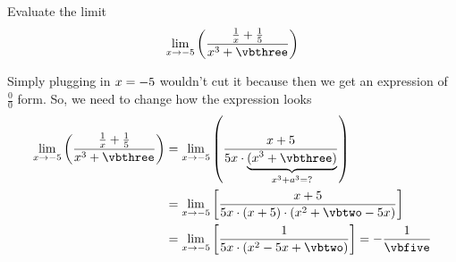 


\POWER{}\vbtwo
\POWER{}\vbthree
\SQUARE\vbtwo\vbfour
\MULTIPLY{}\vbfive

\question[2] Evaluate the limit \[\lim_{x\to -\vbone}\left(\dfrac{\frac{1}{x} + \frac{1}{\vbone}}{x^3+\vbthree} \right) \]

\watchout

\begin{solution}[\mcq]
  Simply plugging in $x=-5$ wouldn't cut it because then we get an expression of $\frac{0}{0}$ form. So, we need to change how the expression looks 
  \begin{align}
    \lim_{x\to -\vbone}\left( \dfrac{\frac{1}{x} + \frac{1}{\vbone}}{x^3 + \vbthree}\right) &=
    \lim_{x\to -\vbone}\left( \dfrac{x + \vbone}{\vbone x\cdot 
    \underbrace{(x^3 + \vbthree)}_{x^3 + a^3 = ?}}\right) \\
    &= \lim_{x\to -\vbone}\left[ \dfrac{x + \vbone}
    {\vbone x\cdot (x + \vbone)\cdot (x^2 + \vbtwo -\vbone x)}\right] \\
    &= \lim_{x\to -\vbone}\left[ \dfrac{1}{\vbone x\cdot (x^2-\vbone x + \vbtwo) }\right] = 
    -\dfrac{1}{\vbfive}
  \end{align}
\end{solution}

